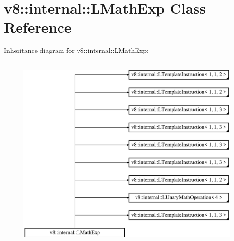 \hypertarget{classv8_1_1internal_1_1_l_math_exp}{}\section{v8\+:\+:internal\+:\+:L\+Math\+Exp Class Reference}
\label{classv8_1_1internal_1_1_l_math_exp}
Inheritance diagram for v8\+:\+:internal\+:\+:L\+Math\+Exp\+:\begin{figure}[H]
\begin{center}
\leavevmode
\includegraphics[height=10.000000cm]{classv8_1_1internal_1_1_l_math_exp}
\end{center}
\end{figure}
